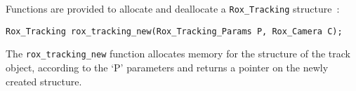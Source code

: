 Functions are provided to allocate and deallocate a \lstinline$Rox_Tracking$ structure~:
\begin{lstlisting}
Rox_Tracking rox_tracking_new(Rox_Tracking_Params P, Rox_Camera C);
\end{lstlisting}
The \lstinline$rox_tracking_new$ function allocates memory for the structure of the track object, according to
the `P' parameters and returns a pointer on the newly created structure. \\




